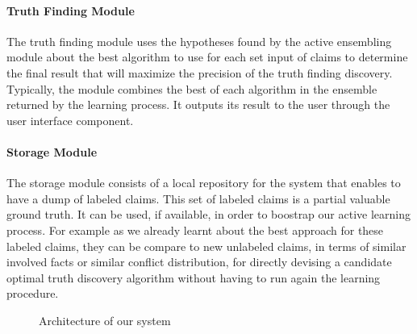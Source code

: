 \paragraph*{Truth Finding Module} The truth finding module uses the hypotheses found by the active ensembling 
module about the best algorithm to use for each set input of claims to determine the final result that will 
maximize the precision of the truth finding discovery. Typically, the module combines the best of each algorithm
in the ensemble returned by the learning process. It outputs its result to the user through the user interface component.



\paragraph*{Storage Module}The storage module consists of a local repository for the system
that enables to have a dump of labeled claims. This set of labeled claims is a partial valuable
ground truth. It can be used, if available, in order to boostrap our active learning process. For
example as we already learnt about the best approach for these labeled claims, they can be compare 
to new unlabeled claims, in terms of similar involved facts or similar conflict distribution, for 
directly devising a candidate optimal truth discovery algorithm without having to run again the learning 
procedure.

\begin{figure}[ht]
\caption{Architecture of our system}\label{system_architecture}
\end{figure}
